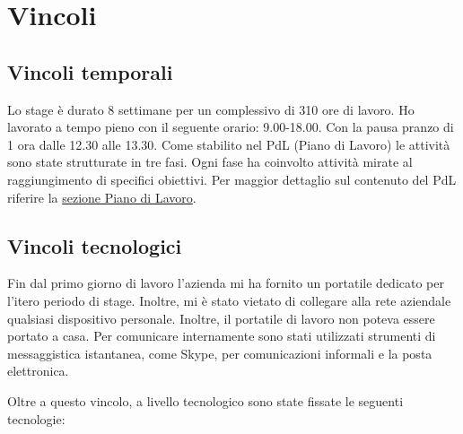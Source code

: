 \section{Vincoli}
\subsection{Vincoli temporali}
Lo stage è durato 8 settimane per un complessivo di 310 ore di lavoro. Ho lavorato a tempo pieno con il seguente orario: 9.00-18.00. Con la pausa pranzo di 1 ora dalle 12.30 alle 13.30. Come stabilito nel PdL (Piano di Lavoro) le attività sono state strutturate in tre fasi. Ogni fase ha coinvolto attività mirate al raggiungimento di specifici obiettivi. Per maggior dettaglio sul contenuto del PdL riferire la \hyperref[sec:piano-di-lavoro]{sezione Piano di Lavoro}.

\subsection{Vincoli tecnologici}

Fin dal primo giorno di lavoro l'azienda mi ha fornito un portatile dedicato per l'itero periodo di stage. Inoltre, mi è stato vietato di collegare alla rete aziendale qualsiasi dispositivo personale. Inoltre, il portatile di lavoro non poteva essere portato a casa.
Per comunicare internamente sono stati utilizzati strumenti di messaggistica istantanea, come Skype, per comunicazioni informali e la posta elettronica.

Oltre a questo vincolo, a livello tecnologico sono state fissate le seguenti tecnologie:

